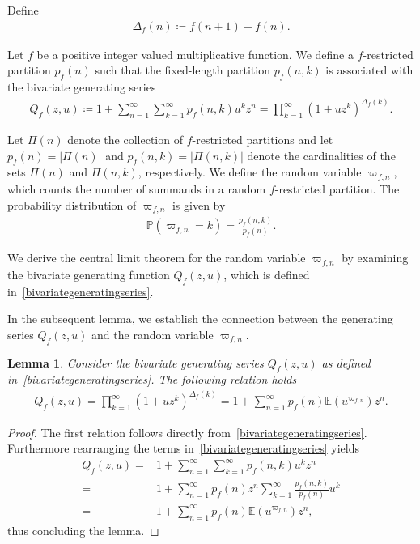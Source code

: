 \documentclass[12pt, oneside,reqno]{amsart}
\numberwithin{equation}{section}
\newtheorem{lemma}[theorem]{Lemma}
\begin{document}
Define
\begin{align}\label{gfunctiondefintion}
\Delta_f(n)
\coloneqq f(n+1)-f(n).
\end{align}

\noindent
Let $f$ be a positive integer valued multiplicative function. We define a $f$-restricted partition $p_f(n)$ such that the fixed-length partition $p_f(n,k)$ is associated with the bivariate generating series
\begin{align}\label{bivariategeneratingseries} 
Q_f(z,u) 
\coloneqq 1+\sum_{n=1}^{\infty}\sum_{k=1}^{\infty} p_f(n,k) u^kz^n
=\prod_{k=1}^{\infty}(1+uz^k)^{\Delta_f(k)}. 
\end{align}

\medskip

Let $\Pi(n)$ denote the collection of $f$-restricted partitions and let $p_f(n)=|\Pi(n)|$ and $p_f(n,k)=|\Pi(n,k)|$ denote the cardinalities of the sets $\Pi(n)$ and $\Pi(n,k)$, respectively. We define the random variable $\varpi_{f,n}$, which counts the number of summands in a random $f$-restricted partition. The probability distribution of $\varpi_{f,n}$ is given by
\begin{align*}
\mathbb{P}(\varpi_{f,n}=k)
=\frac{p_f(n,k)}{p_f(n)}.
\end{align*}

\noindent
We derive the central limit theorem for the random variable $\varpi_{f,n}$ by examining the bivariate generating function $Q_f(z,u)$, which is defined in~\eqref{bivariategeneratingseries}.

\medskip


In the subsequent lemma, we establish the connection between the generating series $Q_f(z,u)$ and the random variable $\varpi_{f,n}$.

\begin{lemma}\label{generatingfunctionlemma}
Consider the bivariate generating series $Q_f(z,u)$ as defined in~\eqref{bivariategeneratingseries}. The following relation holds
\begin{align*}
Q_f(z,u)
=\prod_{k=1}^{\infty}(1+uz^{k})^{\Delta_f(k)}
=1+\sum_{n=1}^{\infty}p_f(n)\mathbb{E}(u^{\varpi_{f,n}})z^n.
\end{align*}
\end{lemma}

\begin{proof}
The first relation follows directly from~\eqref{bivariategeneratingseries}. Furthermore rearranging the terms in~\eqref{bivariategeneratingseries} yields
\begin{align*}
Q_f(z,u)
=&1+\sum_{n=1}^{\infty}\sum_{k=1}^{\infty}p_f(n,k)u^kz^n\\
=&1+\sum_{n=1}^{\infty}p_f(n)z^n\sum_{k=1}^{\infty}\frac{p_f(n,k)}{p_f(n)}u^k\\
=&1+\sum_{n=1}^{\infty}p_f(n)\mathbb{E}(u^{\varpi_{f,n}})z^n,
\end{align*}
thus concluding the lemma.
\end{proof}
\end{document}
